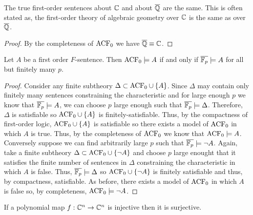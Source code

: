 \documentclass[12pt]{article}
\begin{document}
\begin{theorem}
The true first-order sentences about $\mathbb{C}$ and about $\overline{\mathbb{Q}}$ are the same. This is often stated as, the first-order theory of algebraic geometry over $\mathbb{C}$ is the same as over $\overline{\mathbb{Q}}$.
\end{theorem}

\begin{proof}
By the completeness of $\mathrm{ACF}_{0}$ we have $\overline{\mathbb{Q}} \equiv \mathbb{C}$. 
\end{proof}

\begin{theorem}
Let $A$ be a first order $F$-sentence. Then $\mathrm{ACF}_{0} \models A$ if and only if $\overline{\mathbb{F}_{p}} \models A$ for all but finitely many $p$.   
\end{theorem}

\begin{proof}
Consider any finite subtheory $\Delta \subset \mathrm{ACF}_{0} \cup \{A\}$. Since $\Delta$ may contain only finitely many sentences constraining the characteristic and for large enough $p$ we know that $\overline{\mathbb{F}_{p}} \models A$, we can choose $p$ large enough such that $\overline{\mathbb{F}_{p}}  \models \Delta$. Therefore, $\Delta$ is satisfiable so $\mathrm{ACF}_{0} \cup \{A\}$ is finitely-satisfiable. Thus, by the compactness of first-order logic, $\mathrm{ACF}_{0} \cup \{A\}$ is satisfiable so there exists a model of $\mathrm{ACF}_{0}$ in which $A$ is true. Thus, by the completeness of $\mathrm{ACF}_{0}$ we know that $\mathrm{ACF}_{0} \models A$.   
\bigskip\\
Conversely suppose we can find arbitrarily large $p$ such that $\overline{\mathbb{F}_{p}} \models \neg A$. Again, take a finite subtheory $\Delta \subset \mathrm{ACF}_{0} \cup \{\neg A\}$ and choose $p$ large enought that it satisfies the finite number of sentences in $\Delta$ constraining the characteristic in which $A$ is false. Thus, $\overline{\mathbb{F}_{p}} \models \Delta$ so $\mathrm{ACF}_{0} \cup \{\neg A\}$ is finitely satisfiable and thus, by compactness, satisfiable. As before, there exists a model of $\mathrm{ACF}_{0}$ in which $A$ is false so, by completeness, $\mathrm{ACF}_{0} \models \neg A$. 
\end{proof}

\begin{theorem}[Ax-Grothendiek]
If a polynomial map $f : \mathbb{C}^n \to \mathbb{C}^n$ is injective then it is surjective.
\end{theorem}
\end{document}
